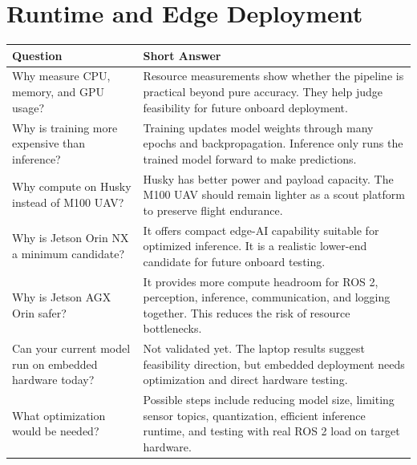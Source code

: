 \documentclass[11pt,a4paper]{article}
\begin{document}
\section*{Runtime and Edge Deployment}
\begin{longtable}{QA}
\toprule
\textbf{Question} & \textbf{Short Answer} \\
\midrule
\endhead
Why measure CPU, memory, and GPU usage? &
Resource measurements show whether the pipeline is practical beyond pure accuracy. They help judge feasibility for future onboard deployment. \\
\addlinespace
Why is training more expensive than inference? &
Training updates model weights through many epochs and backpropagation. Inference only runs the trained model forward to make predictions. \\
\addlinespace
Why compute on Husky instead of M100 UAV? &
Husky has better power and payload capacity. The M100 UAV should remain lighter as a scout platform to preserve flight endurance. \\
\addlinespace
Why is Jetson Orin NX a minimum candidate? &
It offers compact edge-AI capability suitable for optimized inference. It is a realistic lower-end candidate for future onboard testing. \\
\addlinespace
Why is Jetson AGX Orin safer? &
It provides more compute headroom for ROS 2, perception, inference, communication, and logging together. This reduces the risk of resource bottlenecks. \\
\addlinespace
Can your current model run on embedded hardware today? &
Not validated yet. The laptop results suggest feasibility direction, but embedded deployment needs optimization and direct hardware testing. \\
\addlinespace
What optimization would be needed? &
Possible steps include reducing model size, limiting sensor topics, quantization, efficient inference runtime, and testing with real ROS 2 load on target hardware. \\
\bottomrule
\end{longtable}
\end{document}
